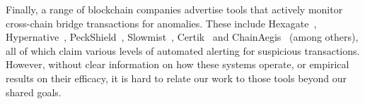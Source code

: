 




Finally, a range of blockchain companies advertise tools that actively
monitor cross-chain bridge transactions for anomalies.  These include
Hexagate~\cite{Hexagate75:online}, Hypernative~\cite{Hypernative:online}, PeckShield~\cite{PeckShie48:online}, Slowmist~\cite{SlowMist92:online}, Certik~\cite{CertiKWh86:online} and ChainAegis~\cite{ChainAeg18:online} (among
others), all of which claim various levels of automated alerting for
suspicious transactions.  However, without clear information on how
these systems operate, or empirical results on their efficacy, it is hard to relate our work to those tools beyond our shared goals.






